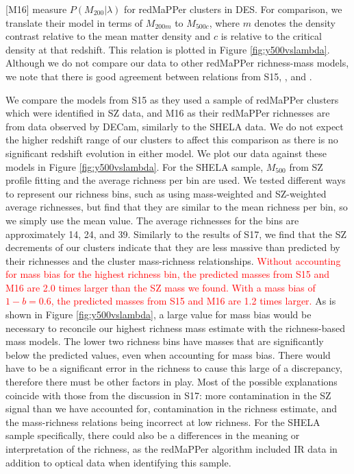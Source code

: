 \documentclass[a4paper,fleqn,usenatbib]{mnras}
\newcommand{\revisit}{\textcolor{red}}
\begin{document}
\cite{2016arXiv161006890M} [M16] measure $P(M_{200}|\lambda)$ for redMaPPer clusters in DES. 
For comparison, we translate their model in terms of $M_{200m}$ to $M_{500c}$, where $m$ denotes the density contrast relative to the mean matter density and $c$ is relative to the critical density at that redshift. 
This relation is plotted in Figure \ref{fig:y500vslambda}. 
Although we do not compare our data to other redMaPPer richness-mass models, we note that there is good agreement between relations from S15, \citet[][which is calibrated for clusters in SDSS]{2017MNRAS.466.3103S}, and \citet[][which is calibrated for clusters in DES Year 1 data]{2018arXiv180500039M}.

We compare the models from S15 as they used a sample of redMaPPer clusters which were identified in SZ data, and M16 as their redMaPPer richnesses are from data observed by DECam, similarly to the SHELA data. 
We do not expect the higher redshift range of our clusters to affect this comparison as there is no significant redshift evolution in either model. 
We plot our data against these models in Figure \ref{fig:y500vslambda}. For the SHELA sample, $M_{500}$ from SZ profile fitting and the average richness per bin are used. 
We tested different ways to represent our richness bins, such as using mass-weighted and SZ-weighted average richnesses, but find that they are similar to the mean richness per bin, so we simply use the mean value. 
The average richnesses for the bins are approximately 14, 24, and 39. 
Similarly to the results of S17, we find that the SZ decrements of our clusters indicate that they are less massive than predicted by their richnesses and the cluster mass-richness relationships.
\revisit{Without accounting for mass bias for the highest richness bin, the predicted masses from S15 and M16 are 2.0 times larger than the SZ mass we found. 
With a  mass bias of $1-b = 0.6$, the predicted masses from S15 and M16 are 1.2 times larger. }
As is shown in Figure \ref{fig:y500vslambda}, a large value for mass bias would be necessary to reconcile our highest richness mass estimate with the richness-based mass models. 
The lower two richness bins have masses that are significantly below the predicted values, even when accounting for mass bias.
There would have to be a significant error in the richness to cause this large of a discrepancy, therefore there must be other factors in play. 
Most of the possible explanations coincide with those from the discussion in S17: more contamination in the SZ signal than we have accounted for, contamination in the richness estimate, and the mass-richness relations being incorrect at low richness. 
For the SHELA sample specifically, there could also be a differences in the meaning or interpretation of the richness, as the redMaPPer algorithm included IR data in addition to optical data when identifying this sample.
\end{document}
